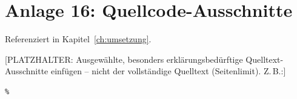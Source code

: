\section*{Anlage 16: Quellcode-Ausschnitte}
\label{anh:quellcode}
Referenziert in Kapitel~\ref{ch:umsetzung}.

[PLATZHALTER: Ausgew\"ahlte, besonders erkl\"arungsbed\"urftige
Quelltext-Ausschnitte einf\"ugen -- nicht der vollst\"andige Quelltext
(Seitenlimit). Z.\,B.:]
\begin{verbatim}
% 
\end{verbatim}
